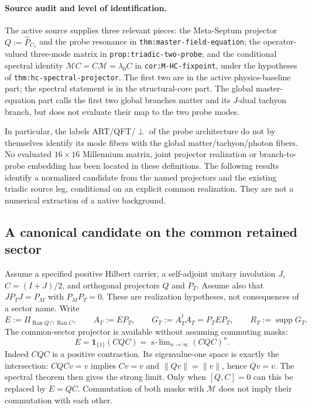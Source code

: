 \documentclass[11pt,a4paper]{article}
\begin{document}
\paragraph{Source audit and level of identification.}
The active source supplies three relevant pieces: the Meta-Septum
projector $Q:=\hat P_{C_7}$ and the probe resonance in
\texttt{thm:master-field-equation}; the operator-valued three-mode
matrix in \texttt{prop:triadic-two-probe}; and the conditional spectral
identity $\mathcal M C=C\mathcal M=\lambda_0C$ in
\texttt{cor:M-HC-fixpoint}, under the hypotheses of
\texttt{thm:hc-spectral-projector}. The first two are in the active
physics-baseline part; the spectral statement is in the structural-core
part. The global master-equation part calls the first two global
branches matter and its $J$-dual tachyon branch, but does not evaluate
their map to the two probe modes.

In particular, the labels ART/QFT/$\perp$ of the probe architecture
do not by themselves identify its mode fibers with the global
matter/tachyon/photon fibers. No evaluated $16\times16$ Millennium
matrix, joint projector realization or branch-to-probe embedding has
been located in these definitions. The following results identify a
normalized candidate from the named projectors and the existing
triadic source leg, conditional on an explicit common realization.
They are not a numerical extraction of a native background.

\subsection{A canonical candidate on the common retained sector}

Assume a specified positive Hilbert carrier, a self-adjoint unitary
involution $J$, $C=(I+J)/2$, and orthogonal projectors $Q$ and $P_T$.
Assume also that $J P_T J=P_M$ with $P_MP_T=0$. These are realization
hypotheses, not consequences of a sector name. Write
\[
 E:=\Pi_{\operatorname{Ran}Q\cap\operatorname{Ran}C},
 \qquad A_T:=EP_T,\qquad G_T:=A_T^\dagger A_T=P_TEP_T,
 \qquad R_T:=\operatorname{supp}G_T.
\]
The common-sector projector is available without assuming commuting
masks:
\[
 E=\mathbf1_{\{1\}}(CQC)
   =\mathop{\mathrm{s\!-\!lim}}_{n\to\infty}(CQC)^n.
\]
Indeed $CQC$ is a positive contraction. Its eigenvalue-one space is
exactly the intersection: $CQCv=v$ implies $Cv=v$ and
$\|Qv\|=\|v\|$, hence $Qv=v$. The spectral theorem then gives the
strong limit. Only when $[Q,C]=0$ can this be replaced by $E=QC$.
Commutation of both masks with $\mathcal M$ does not imply their
commutation with each other.
\end{document}
